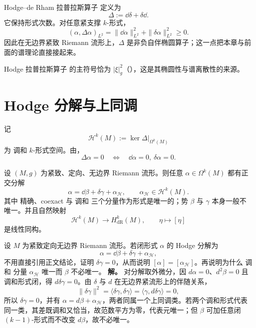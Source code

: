 Hodge--de Rham 拉普拉斯算子 定义为
\begin{equation*}\Delta:=\dd\delta+\delta\dd.
\end{equation*}
它保持形式次数。对任意紧支撑 $k$-形式，
\begin{equation}\label{eq:math-dg-hodge-energy}
(\alpha,\Delta\alpha)_{L^2}
=\|\dd\alpha\|_{L^2}^2+\|\delta\alpha\|_{L^2}^2\ge0.
\end{equation}
因此在无边界紧致 Riemann 流形上，$\Delta$ 是非负自伴椭圆算子；这一点把本章与前面的谱理论直接接起来。

Hodge 拉普拉斯算子 的主符号恰为 $|\xi|_g^2$（），这是其椭圆性与谱离散性的来源。

\section{Hodge 分解与上同调}

记
\[
\mathcal H^k(M):=\ker\Delta\big|_{\Omega^k(M)}
\]
为 调和 $k$-形式空间。由，
\begin{equation}\label{eq:math-dg-harmonic-closed-coclosed}
\Delta\alpha=0
\quad\Longleftrightarrow\quad
\dd\alpha=0,
\ \delta\alpha=0.
\end{equation}

\begin{theorem}\label{thm:math-dg-hodge-decomposition}
设 $(M,g)$ 为紧致、定向、无边界 Riemann 流形。则任意 $\alpha\in\Omega^k(M)$ 都有正交分解
\begin{equation}\label{eq:math-dg-hodge-decomposition}
\boxed{
\alpha=\dd\beta+\delta\gamma+\alpha_{\mathcal H},
\qquad
\alpha_{\mathcal H}\in\mathcal H^k(M).}
\end{equation}
其中 精确、coexact 与 调和 三个分量作为形式是唯一的；势 $\beta$ 与 $\gamma$ 本身一般不唯一。并且自然映射
\begin{equation*}\mathcal H^k(M)\longrightarrow H_{\mathrm{dR}}^k(M),
\qquad
\eta\longmapsto[\eta]
\end{equation*}
是线性同构。
\end{theorem}


\par
\begin{workedexample}
设 \(M\) 为紧致定向无边界 Riemann 流形。若闭形式 \(\alpha\) 的 Hodge 分解为
\[
\alpha=\dd\beta+\delta\gamma+\alpha_{\mathcal H},
\]
不用直接引用正文结论，证明 \(\delta\gamma=0\)，从而说明 \([\alpha]=[\alpha_{\mathcal H}]\)。再说明为什么 调和 分量 \(\alpha_{\mathcal H}\) 唯一而 \(\beta\) 不必唯一。
\textbf{解。} 对分解取外微分，因 \(d\alpha=0\)、\(d^2\beta=0\) 且调和形式闭，得 \(d\delta\gamma=0\)。由 \(\delta\) 与 \(d\) 在无边界紧流形上的伴随关系，
\[
\|\delta\gamma\|^2=\langle\delta\gamma,\delta\gamma\rangle
=\langle\gamma,d\delta\gamma\rangle=0,
\]
所以 \(\delta\gamma=0\)，并有 \(\alpha=d\beta+\alpha_{\mathcal H}\)，两者同属一个上同调类。若两个调和形式代表同一类，其差既调和又恰当，故范数平方为零，代表元唯一；但 \(\beta\) 可加任意闭 \((k-1)\)-形式而不改变 \(d\beta\)，故不必唯一。
\end{workedexample}
\par

